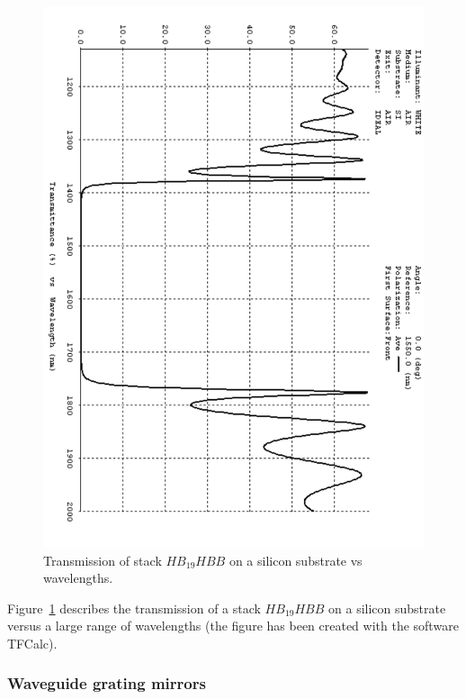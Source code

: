 \begin{figure}
\begin{center}
\includegraphics [scale =0.4, angle=90]{./Sec_Optics/HB19HBB.pdf}
\caption {Transmission of stack $HB_{19}HBB$ on a silicon substrate vs wavelengths.}\label{fig:stack}
\end{center}
\end{figure}

Figure~\ref{fig:stack} describes the transmission of a stack $HB_{19}HBB$ on a silicon substrate versus a large range of wavelengths (the figure has been created with the software TFCalc). 

\FloatBarrier
\subsubsection{Waveguide grating mirrors}

